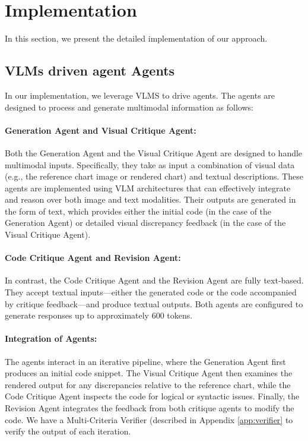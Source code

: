 


\section{Implementation}
\label{app:implementation}

In this section, we present the detailed implementation of our approach.

\subsection{VLMs driven agent Agents}
\label{app:agents}

In our implementation, we leverage VLMS to drive agents. The agents are designed to process and generate multimodal information as follows:

\paragraph{\textbf{Generation Agent and Visual Critique Agent:}}  
Both the Generation Agent and the Visual Critique Agent are designed to handle multimodal inputs. Specifically, they take as input a combination of visual data (e.g., the reference chart image or rendered chart) and textual descriptions. These agents are implemented using VLM architectures that can effectively integrate and reason over both image and text modalities. Their outputs are generated in the form of text, which provides either the initial code (in the case of the Generation Agent) or detailed visual discrepancy feedback (in the case of the Visual Critique Agent).

\paragraph{\textbf{Code Critique Agent and Revision Agent:}}  
In contrast, the Code Critique Agent and the Revision Agent are fully text-based. They accept textual inputs—either the generated code or the code accompanied by critique feedback—and produce textual outputs. Both agents are configured to generate responses up to approximately 600 tokens. 

\paragraph{\textbf{Integration of Agents:}}  
The agents interact in an iterative pipeline, where the Generation Agent first produces an initial code snippet. The Visual Critique Agent then examines the rendered output for any discrepancies relative to the reference chart, while the Code Critique Agent inspects the code for logical or syntactic issues. Finally, the Revision Agent integrates the feedback from both critique agents to modify the code. We have a Multi-Criteria Verifier (described in Appendix \ref{app:verifier} to verify the output of each iteration.


